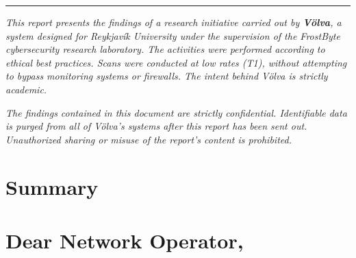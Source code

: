 \documentclass[12pt]{article}
\title{Network Scan Report: \texttt{$cidr}}
\author{Völva: FrostByte}
\date{\today}
\begin{document}
\maketitle
\rule{\textwidth}{0.4pt}

\vspace{1em}
\begin{center}
\begin{scriptsize}
\textit{This report presents the findings of a research initiative carried out by \textbf{Völva}, a system designed for Reykjavík University under the supervision of the FrostByte cybersecurity research laboratory. The activities were performed according to ethical best practices. Scans were conducted at low rates (T1), without attempting to bypass monitoring systems or firewalls. The intent behind Völva is strictly academic.}

\vspace{1em}

\textit{The findings contained in this document are strictly confidential. Identifiable data is purged from all of Völva's systems after this report has been sent out. Unauthorized sharing or misuse of the report’s content is prohibited.}
\end{scriptsize}
\end{center}

\vspace{1em}

\vspace{-1em}
\section*{Summary}

\vspace{1em}
\section*{Dear Network Operator,}
\end{document}
